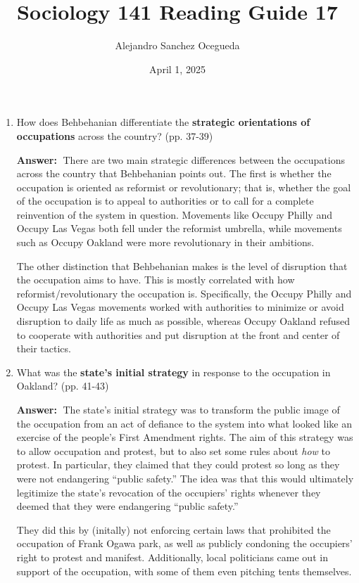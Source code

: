 \documentclass{article}
\title{Sociology 141 Reading Guide 17}
\author{Alejandro Sanchez Ocegueda}
\date{April 1, 2025}
\newcommand{\answer}{\textbf{Answer:}$\;$}
\begin{document}
\maketitle

\begin{enumerate}[label=\arabic*)]
    \item How does Behbehanian differentiate the \textbf{strategic orientations of occupations} across the country? (pp. 37-39)
    
    \answer 
    There are two main strategic differences between the occupations across the country that Behbehanian points out.
    The first is whether the occupation is oriented as reformist or revolutionary;
    that is, whether the goal of the occupation is to appeal to authorities or to call for a complete reinvention of the system in question.
    Movements like Occupy Philly and Occupy Las Vegas both fell under the reformist umbrella, while movements such as Occupy Oakland were more revolutionary in their ambitions.
    
    The other distinction that Behbehanian makes is the level of disruption that the occupation aims to have.
    This is mostly correlated with how reformist/revolutionary the occupation is.
    Specifically, the Occupy Philly and Occupy Las Vegas movements worked with authorities to minimize or avoid disruption to daily life as much as possible, whereas Occupy Oakland refused to cooperate with authorities and put disruption at the front and center of their tactics.
    
    \item What was the \textbf{state's initial strategy} in response to the occupation in Oakland? (pp. 41-43)
    
    \answer 
    The state's initial strategy was to transform the public image of the occupation from an act of defiance to the system into what looked like an exercise of the people's First Amendment rights.
    The aim of this strategy was to allow occupation and protest, but to also set some rules about \textit{how} to protest.
    In particular, they claimed that they could protest so long as they were not endangering ``public safety.''
    The idea was that this would ultimately legitimize the state's revocation of the occupiers' rights whenever they deemed that they were endangering ``public safety.''
    
    They did this by (initally) not enforcing certain laws that prohibited the occupation of Frank Ogawa park, as well as publicly condoning the occupiers' right to protest and manifest.
    Additionally, local politicians came out in support of the occupation, with some of them even pitching tents themselves.    
    

\end{enumerate}
\end{document}
